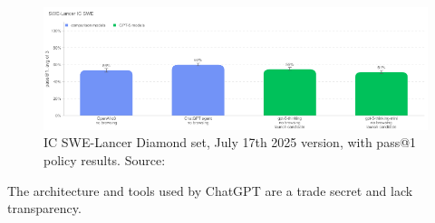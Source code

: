 \documentclass[12pt]{article}
\begin{document}
	\begin{figure}[H]
    \centering
            \includegraphics[width=1\textwidth]{SWE-lancerChatGPT.png}
    \caption[GPT-5 SWE-lancher]{IC SWE-Lancer Diamond set, July 17th 2025 version, with pass@1 policy results. Source: \cite{OpenAIGPT-5SystemCard}}
    \end{figure}

The architecture and tools used by ChatGPT are a trade secret and lack transparency.
\end{document}
